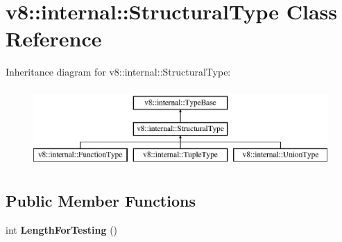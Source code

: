 \hypertarget{classv8_1_1internal_1_1_structural_type}{}\section{v8\+:\+:internal\+:\+:Structural\+Type Class Reference}
\label{classv8_1_1internal_1_1_structural_type}
Inheritance diagram for v8\+:\+:internal\+:\+:Structural\+Type\+:\begin{figure}[H]
\begin{center}
\leavevmode
\includegraphics[height=3.000000cm]{classv8_1_1internal_1_1_structural_type}
\end{center}
\end{figure}
\subsection*{Public Member Functions}
\begin{DoxyCompactItemize}
\item 
int {\bfseries Length\+For\+Testing} ()\hypertarget{classv8_1_1internal_1_1_structural_type_a20feaf363dfb30b78138ab35d667b486}{}\label{classv8_1_1internal_1_1_structural_type_a20feaf363dfb30b78138ab35d667b486}

\end{DoxyCompactItemize}

